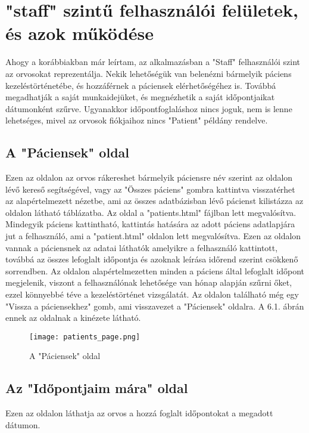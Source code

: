 \chapter{"staff" szintű felhasználói felületek, és azok működése}
\label{chap:fejezet6}

Ahogy a korábbiakban már leírtam, az alkalmazásban a "Staff" felhasználói szint az orvosokat reprezentálja. Nekik lehetőségük van belenézni bármelyik páciens kezeléstörténetébe, és hozzáférnek a páciensek elérhetőségéhez is. Továbbá megadhatják a saját munkaidejüket, és megnézhetik a saját időpontjaikat dátumonként szűrve. Ugyanakkor időpontfoglaláshoz nincs joguk, nem is lenne lehetséges, mivel az orvosok fiókjaihoz nincs "Patient" példány rendelve.

\section{A "Páciensek" oldal}

Ezen az oldalon az orvos rákereshet bármelyik páciensre név szerint az oldalon lévő kereső segítségével, vagy az "Összes páciens" gombra kattintva visszatérhet az alapértelmezett nézetbe, ami az összes adatbázisban lévő pácienst kilistázza az oldalon látható táblázatba. Az oldal a "patients.html" fájlban lett megvalósítva. Mindegyik páciens kattintható, kattintás hatására az adott páciens adatlapjára jut a felhasználó, ami a "patient.html" oldalon lett megvalósítva. Ezen az oldalon vannak a páciensnek az adatai láthatók amelyikre a felhasználó kattintott, továbbá az összes lefoglalt időpontja és azoknak leírása időrend szerint csökkenő sorrendben. Az oldalon alapértelmezetten minden a páciens által lefoglalt időpont megjelenik, viszont a felhasználónak lehetősége van hónap alapján szűrni őket, ezzel könnyebbé téve a kezeléstörténet vizsgálatát. Az oldalon található még egy "Vissza a páciensekhez" gomb, ami visszavezet a "Páciensek" oldalra. A 6.1. ábrán ennek az oldalnak a kinézete látható.

\begin{figure}[H]
	\caption{A "Páciensek" oldal}
	\label{fig:paciensek}
	\centering
	\texttt{[image: patients\_page.png]}
\end{figure}

\section{Az "Időpontjaim mára" oldal}

Ezen az oldalon láthatja az orvos a hozzá foglalt időpontokat a megadott dátumon.

